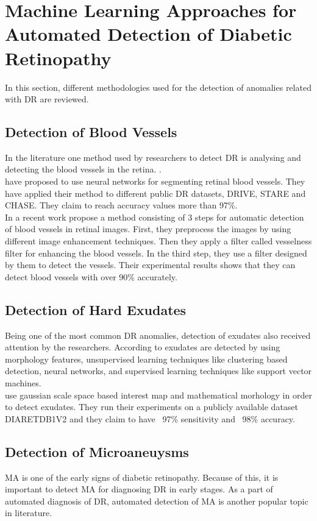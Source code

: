 \section{Machine Learning Approaches for Automated Detection of Diabetic Retinopathy}
In this section, different methodologies used for the detection of anomalies related with DR are reviewed. 

\subsection{Detection of Blood Vessels}
In the literature one method used by researchers to detect DR is analysing and detecting the blood vessels in the retina. \citep{liskowski2016segmenting, elbalaoui2016automatic}.\\ 
\citet{liskowski2016segmenting} have proposed to use neural networks for segmenting retinal blood vessels. They have applied their method to different public DR datasets, DRIVE, STARE and CHASE. They claim to reach accuracy values more than 97\%. \\
In a recent work \citet{elbalaoui2016automatic} propose a method consisting of 3 steps for automatic detection of blood vessels in retinal images. First, they preprocess the images by using different image enhancement techniques. Then they apply a filter called vesselness filter for enhancing the blood vessels. In the third step, they use a filter designed by them to detect the vessels. Their experimental results shows that they can detect blood vessels with over 90\% accurately.   
\subsection{Detection of Hard Exudates}
Being one of the most common DR anomalies, detection of exudates also received attention by the researchers.  \citep{rocha2011points}
According to \citet{zohoradetection} exudates are detected by using morphology features, unsupervised learning techniques like clustering based detection, neural networks, and supervised learning techniques like support vector machines.\\ 
\citet{haloigaussian} use gaussian scale space based interest map and mathematical morhology in order to detect exudates. They run their experiments on a publicly available dataset DIARETDB1V2 and they claim to have ~97\% sensitivity and ~98\% accuracy.  



\subsection{Detection of Microaneuysms}
MA is one of the early signs of diabetic retinopathy. Because of this, it is important to detect MA for diagnosing DR in early stages. As a part of automated diagnosis of DR, automated detection of MA is another popular topic in literature. 

